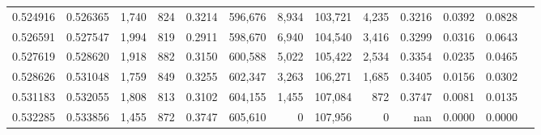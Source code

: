 \begin{tabular}{rrrrrrrrrrrrr}
0.524916 & 0.526365 &  1,740 &   824 &                                     0.3214 & 596,676 &   8,934 & 103,721 &   4,235 & 0.3216 & 0.0392 & 0.0828 \\
0.526591 & 0.527547 &  1,994 &   819 &                                     0.2911 & 598,670 &   6,940 & 104,540 &   3,416 & 0.3299 & 0.0316 & 0.0643 \\
0.527619 & 0.528620 &  1,918 &   882 &                                     0.3150 & 600,588 &   5,022 & 105,422 &   2,534 & 0.3354 & 0.0235 & 0.0465 \\
0.528626 & 0.531048 &  1,759 &   849 &                                     0.3255 & 602,347 &   3,263 & 106,271 &   1,685 & 0.3405 & 0.0156 & 0.0302 \\
0.531183 & 0.532055 &  1,808 &   813 &                                     0.3102 & 604,155 &   1,455 & 107,084 &     872 & 0.3747 & 0.0081 & 0.0135 \\
0.532285 & 0.533856 &  1,455 &   872 &                                     0.3747 & 605,610 &       0 & 107,956 &       0 &    nan & 0.0000 & 0.0000 \\
\bottomrule
\end{tabular}
